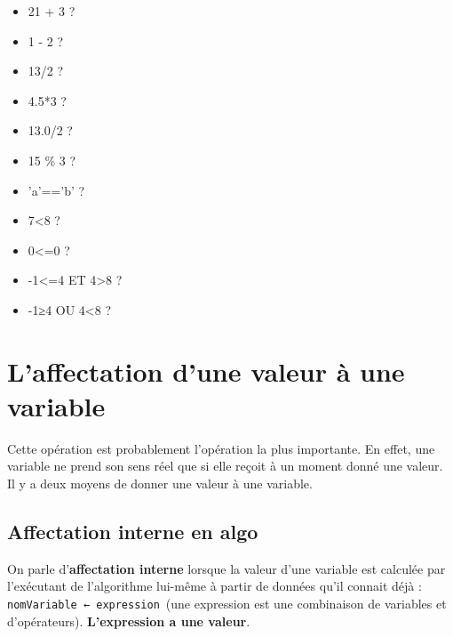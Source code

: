 \documentclass[11pt,a4paper]{article}
\begin{document}
					\begin{itemize}
				
			\item 21 + 3 ? \textcolor{gray}{\underline{\hspace*{2em}}} 
			\item 1 - 2 ? \textcolor{gray}{\underline{\hspace*{2em}}} 
			\item 13/2 ? \textcolor{gray}{\underline{\hspace*{1em}}} 
			\item 4.5*3 ? \textcolor{gray}{\underline{\hspace*{3em}}} 
			\item 13.0/2 ? \textcolor{gray}{\underline{\hspace*{2em}}} 
			\item 15 \% 3 ?  \textcolor{gray}{\underline{\hspace*{1em}}} 
			\item 'a'=='b' ? \textcolor{gray}{\underline{\hspace*{3em}}} 
			\item 7<8 ?  \textcolor{gray}{\underline{\hspace*{3em}}} 
			\item 0<=0 ?  \textcolor{gray}{\underline{\hspace*{3em}}} 
			\item -1<=4 ET 4>8 ?  \textcolor{gray}{\underline{\hspace*{3em}}} 
			\item -1≥4 OU 4<8 ?  \textcolor{gray}{\underline{\hspace*{3em}}} 
					\end{itemize}
				\section{L'affectation d'une valeur \`a une variable}
				Cette op\'eration est probablement l'op\'eration la plus importante. En effet, une variable ne
        prend son sens r\'eel que si elle re\c coit \`a un moment donn\'e une valeur. Il y a deux moyens de
        donner une valeur \`a une variable.
      
            \par
        \subsection{Affectation interne en algo}
          On parle d'\textbf{affectation interne} lorsque la valeur d'une variable est \guillemotleft  calcul\'ee \guillemotright  par l'ex\'ecutant
          de l'algorithme lui-m\^eme \`a partir de donn\'ees qu'il connait d\'ej\`a :
          \,\verb|nomVariable ← expression|\,
          (une expression est une combinaison de variables et d'op\'erateurs). \textbf{L'expression a une valeur}.
        
\end{document}
